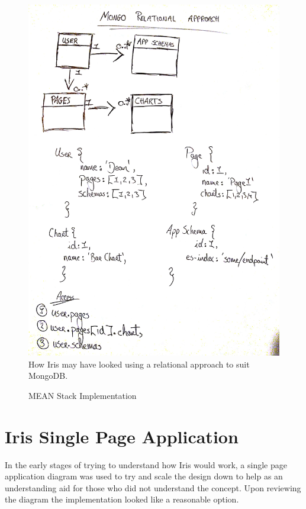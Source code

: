 \documentclass[12pt,a4paper,titlepage]{report}
\begin{document}
\begin{appendices}
\begin{figure}[H]
\begin{tcolorbox}
\includegraphics[width=\textwidth,height=\textheight,keepaspectratio]{mongo_relation}
\newline
How Iris may have looked using a relational approach to suit MongoDB.
\end{tcolorbox}
\caption{MEAN Stack Implementation}
\end{figure}

\section{Iris Single Page Application}

In the early stages of trying to understand how Iris would work, a single page application diagram was used to try and scale the design down to help as an understanding aid for those who did not understand the concept. Upon reviewing the diagram the implementation looked like a reasonable option. 


\end{appendices}
\end{document}
